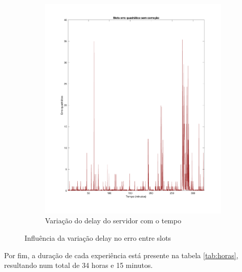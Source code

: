 \begin{figure}[h]
\begin{subfigure}{0.49\linewidth}
        \includegraphics[width=\linewidth]{figures/erro_quadratico_delay.png}
        \caption{Variação do delay do servidor com o tempo}
        \label{fig:delay}
      \end{subfigure}
      \caption{Influência da variação delay no erro entre slots}
      \label{fig:delay_vs_erro}
    \end{figure}

    Por fim, a duração de cada experiência está presente na tabela \ref{tab:horas}, resultando num total de 34 horas e 15 minutos.
    
    